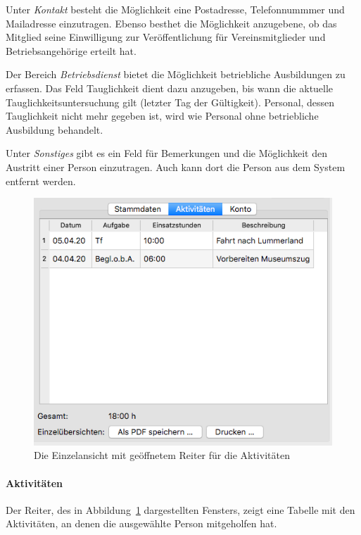 Unter \emph{Kontakt} besteht die Möglichkeit eine Postadresse, Telefonnummmer und Mailadresse einzutragen.
Ebenso besthet die Möglichkeit anzugebene, ob das Mitglied seine Einwilligung zur Veröffentlichung für Vereinsmitglieder und Betriebsangehörige erteilt hat.

Der Bereich \emph{Betriebsdienst} bietet die Möglichkeit betriebliche Ausbildungen zu erfassen.
Das Feld Tauglichkeit dient dazu anzugeben, bis wann die aktuelle Tauglichkeitsuntersuchung gilt (letzter Tag der Gültigkeit).
Personal, dessen Tauglichkeit nicht mehr gegeben ist, wird wie Personal ohne betriebliche Ausbildung behandelt.

Unter \emph{Sonstiges} gibt es ein Feld für Bemerkungen und die Möglichkeit den Austritt einer Person einzutragen.
Auch kann dort die Person aus dem System entfernt werden.



\begin{figure}[!h]
	\centering
	\includegraphics[width=.75\textwidth]{img/einzelansicht_aktivitaeten}
	\caption{Die Einzelansicht mit geöffnetem Reiter für die Aktivitäten}
	\label{fig:personal:einzel:aktivitaeten}
\end{figure}
\paragraph{Aktivitäten}
Der Reiter,
des in Abbildung~\ref{fig:personal:einzel:aktivitaeten} dargestellten Fensters,
zeigt eine Tabelle mit den Aktivitäten,
an denen die ausgewählte Person mitgeholfen hat.


